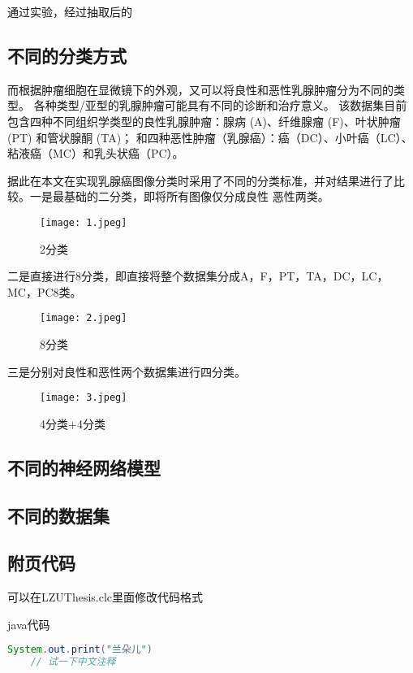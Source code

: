 \documentclass[AutoFakeBold]{LZUThesis}
\begin{document}
通过实验，经过抽取后的


\subsection{不同的分类方式}
而根据肿瘤细胞在显微镜下的外观，又可以将良性和恶性乳腺肿瘤分为不同的类型。
各种类型/亚型的乳腺肿瘤可能具有不同的诊断和治疗意义。
该数据集目前包含四种不同组织学类型的良性乳腺肿瘤：腺病 (A)、纤维腺瘤 (F)、叶状肿瘤 (PT) 和管状腺酮 (TA)；
和四种恶性肿瘤（乳腺癌）：癌（DC）、小叶癌（LC）、粘液癌（MC）和乳头状癌（PC）。
 
据此在本文在实现乳腺癌图像分类时采用了不同的分类标准，并对结果进行了比较。一是最基础的二分类，即将所有图像仅分成良性
恶性两类。

\begin{figure}[H]
    \centering
    \texttt{[image: 1.jpeg]}
    \caption{2分类}
    \label{figure}
 \end{figure}


二是直接进行8分类，即直接将整个数据集分成A，F，PT，TA，DC，LC，MC，PC8类。

\begin{figure}[H]
    \centering
    \texttt{[image: 2.jpeg]}
    \caption{8分类}
    \label{figure}
 \end{figure}


三是分别对良性和恶性两个数据集进行四分类。

\begin{figure}[H]
    \centering
    \texttt{[image: 3.jpeg]}
    \caption{4分类+4分类}
    \label{figure}
 \end{figure}

 

\subsection{不同的神经网络模型}


\subsection{不同的数据集}



\subsection{附页代码} %
\label{sub:附页代码}
可以在LZUThesis.clc里面修改代码格式

java代码
\begin{lstlisting}[language = java]
    System.out.print("兰朵儿")
    // 试一下中文注释
\end{lstlisting}
\end{document}

